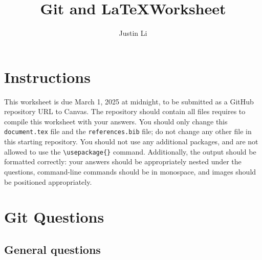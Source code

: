 \documentclass[10pt,twocolumn]{article}
\title{Git and \LaTeX Worksheet}
\author{Justin Li}
\affiliation{Occidental College}
\begin{document}
\maketitle

\section{Instructions}

This worksheet is due March 1, 2025 at midnight, to be submitted as a GitHub repository URL to Canvas. The repository should contain all files requires to compile this worksheet with your answers. You should only change this \texttt{document.tex} file and the  \texttt{references.bib} file; do not change any other file in this starting repository. You should not use any additional packages, and are not allowed to use the \texttt{{\textbackslash}usepackage\{\}} command. Additionally, the output should be formatted correctly: your answers should be appropriately nested under the questions, command-line commands should be in monospace, and images should be positioned appropriately.

\section{Git Questions}

\subsection{General questions}
\end{document}
